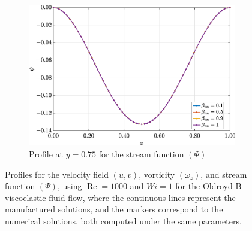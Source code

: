 \documentclass[preprint, 12pt]{elsarticle}
\begin{document}
\begin{figure}[H]
\begin{subfigure}[b]{.46\textwidth}
        \includegraphics[width=\textwidth]{Slice_y_Tog_Numerical_NormErr_2nd_Betann_1_Re_1000_Wi_1_epsilon_0_xi_0_alphaG_0_Dt_1e-06_at_0.05_tipsim_1_MMS_12_x0.75y0.75_Psi.eps}
        \caption{Profile at $y=0.75$ for the stream function $(\Psi)$}
        \label{fig_slice_y_psi_2nd_Case1_oldorydb}
    \end{subfigure}
    \vspace{0.02cm}
    \caption{Profiles for the velocity field $(u,v)$, vorticity $(\omega_{z})$, and stream function $(\Psi)$, using $\operatorname{Re}=1000$ and $Wi=1$ for the Oldroyd-B viscoelastic fluid flow, where the continuous lines represent the manufactured solutions, and the markers correspond to the numerical solutions, both computed under the same parameters.\label{fig_slice_Solution_uvwzpsi_oldroydb_y}}
\end{figure}
\end{document}
